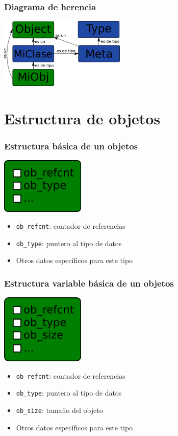\documentclass[10pt]{beamer}
\begin{document}
  \begin{frame}[containsverbatim]
    \frametitle{Diagrama de herencia}
    \begin{center}\includegraphics[width=6cm]{img/Metaclass-Relation.png}\end{center}
  \end{frame}

  \section*{Estructura de objetos}

  \begin{frame}[containsverbatim]
    \frametitle{Estructura básica de un objetos}
    \begin{center}\includegraphics[width=4cm]{img/PyObject.png}\end{center}
    \begin{itemize}
      \item \verb+ob_refcnt+: contador de referencias
      \item \verb+ob_type+: puntero al tipo de datos
      \item Otros datos específicos para este tipo
    \end{itemize}
  \end{frame}

  \begin{frame}[containsverbatim]
    \frametitle{Estructura variable básica de un objetos}
    \begin{center}\includegraphics[width=4cm]{img/PyVarObject.png}\end{center}
    \begin{itemize}
      \item \verb+ob_refcnt+: contador de referencias
      \item \verb+ob_type+: puntero al tipo de datos
      \item \verb+ob_size+: tamaño del objeto
      \item Otros datos específicos para este tipo
    \end{itemize}
  \end{frame}
\end{document}
